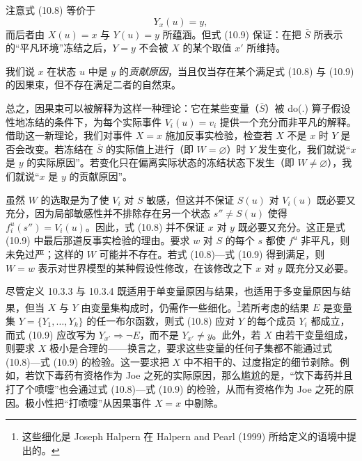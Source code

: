 注意式 \textup{(10.8)} 等价于
\begin{equation}
Y_x(u)=y,\tag{10.10}
\end{equation}
而后者由 $X(u)=x$ 与 $Y(u)=y$ 所蕴涵。但式 \textup{(10.9)} 保证：在把 $\bar S$ 所表示的“平凡环境”冻结之后，$Y=y$ 不会被 $X$ 的某个取值 $x'$ 所维持。

\begin{definition}[贡献原因]
我们说 $x$ 在状态 $u$ 中是 $y$ 的\emph{贡献原因}，当且仅当存在某个满足式 \textup{(10.8)} 与 \textup{(10.9)} 的因果束，但不存在满足二者的自然束。
\end{definition}

总之，因果束可以被解释为这样一种理论：它在某些变量（$\bar S$）被 do(.) 算子假设性地冻结的条件下，为每个实际事件 $V_i(u)=v_i$ 提供一个充分而非平凡的解释。借助这一新理论，我们对事件 $X=x$ 施加反事实检验，检查若 $X$ 不是 $x$ 时 $Y$ 是否会改变。若冻结在 $\bar S$ 的实际值上进行（即 $W=\varnothing$）时 $Y$ 发生变化，我们就说“$x$ 是 $y$ 的实际原因”。若变化只在偏离实际状态的冻结状态下发生（即 $W\neq\varnothing$），我们就说“$x$ 是 $y$ 的贡献原因”。

\begin{remarkenv}
虽然 $W$ 的选取是为了使 $V_i$ 对 $S$ 敏感，但这并不保证 $S(u)$ 对 $V_i(u)$ 既必要又充分，因为局部敏感性并不排除存在另一个状态 $s''\neq S(u)$ 使得 $f_i^u(s'')=V_i(u)$。因此，式 \textup{(10.8)} 并不保证 $x$ 对 $y$ 既必要又充分。这正是式 \textup{(10.9)} 中最后那道反事实检验的理由。要求 $w$ 对 $S$ 的每个 $s$ 都使 $f^u$ 非平凡，则未免过严；这样的 $W$ 可能并不存在。若式 \textup{(10.8)}—式 \textup{(10.9)} 得到满足，则 $W=w$ 表示对世界模型的某种假设性修改，在该修改之下 $x$ 对 $y$ 既充分又必要。
\end{remarkenv}

尽管定义 10.3.3 与 10.3.4 既适用于单变量原因与结果，也适用于多变量原因与结果，但当 $X$ 与 $Y$ 由变量集构成时，仍需作一些细化。\footnote{这些细化是 Joseph Halpern 在 Halpern and Pearl (1999) 所给定义的语境中提出的。}若所考虑的结果 $E$ 是变量集 $Y=\{Y_1,\dots,Y_k\}$ 的任一布尔函数，则式 \textup{(10.8)} 应对 $Y$ 的每个成员 $Y_i$ 都成立，而式 \textup{(10.9)} 应改写为 $Y_{x'}\Rightarrow\neg E$，而不是 $Y_{x'}\neq y$。此外，若 $X$ 由若干变量组成，则要求 $X$ 极小是合理的——换言之，要求这些变量的任何子集都不能通过式 \textup{(10.8)}—式 \textup{(10.9)} 的检验。这一要求把 $X$ 中不相干的、过度指定的细节剥除。例如，若饮下毒药有资格作为 Joe 之死的实际原因，那么尴尬的是，“饮下毒药并且打了个喷嚏”也会通过式 \textup{(10.8)}—式 \textup{(10.9)} 的检验，从而有资格作为 Joe 之死的原因。极小性把“打喷嚏”从因果事件 $X=x$ 中剔除。

